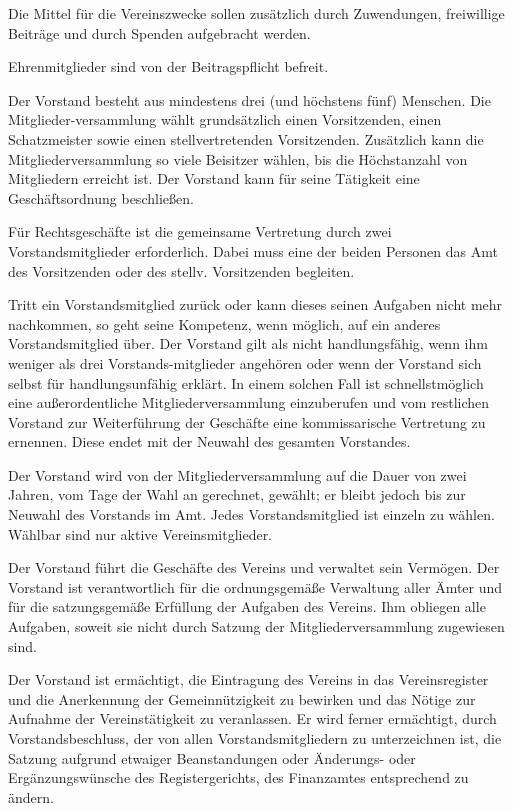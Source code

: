 \documentclass[parskip]{scrartcl}
\begin{document}
\begin{contract}
Die Mittel für die Vereinszwecke sollen zusätzlich durch Zuwendungen, freiwillige Beiträge und durch Spenden aufgebracht werden.

Ehrenmitglieder sind von der Beitragspflicht befreit.


Der Vorstand besteht aus mindestens drei (und höchstens fünf) Menschen. Die Mitglieder-versammlung wählt grundsätzlich einen Vorsitzenden, einen Schatzmeister sowie einen stellvertretenden Vorsitzenden. Zusätzlich kann die Mitgliederversammlung so viele Beisitzer wählen, bis die Höchstanzahl von Mitgliedern erreicht ist. Der Vorstand kann für seine Tätigkeit eine Geschäftsordnung beschließen.

Für Rechtsgeschäfte ist die gemeinsame Vertretung durch zwei Vorstandsmitglieder erforderlich. Dabei muss eine der beiden Personen das Amt des Vorsitzenden oder des stellv. Vorsitzenden begleiten.

Tritt ein Vorstandsmitglied zurück oder kann dieses seinen Aufgaben nicht mehr nachkommen, so geht seine Kompetenz, wenn möglich, auf ein anderes Vorstandsmitglied über. Der Vorstand gilt als nicht handlungsfähig, wenn ihm weniger als drei Vorstands-mitglieder angehören oder wenn der Vorstand sich selbst für handlungsunfähig erklärt. In einem solchen Fall ist schnellstmöglich eine außerordentliche Mitgliederversammlung einzuberufen und vom restlichen Vorstand zur Weiterführung der Geschäfte eine kommissarische Vertretung zu ernennen. Diese endet mit der Neuwahl des gesamten Vorstandes.


Der Vorstand wird von der Mitgliederversammlung auf die Dauer von zwei Jahren, vom Tage der Wahl an gerechnet, gewählt; er bleibt jedoch bis zur Neuwahl des Vorstands im Amt. Jedes Vorstandsmitglied ist einzeln zu wählen. Wählbar sind nur aktive Vereinsmitglieder.

Der Vorstand führt die Geschäfte des Vereins und verwaltet sein Vermögen. Der Vorstand ist verantwortlich für die ordnungsgemäße Verwaltung aller Ämter und für die satzungsgemäße Erfüllung der Aufgaben des Vereins. Ihm obliegen alle Aufgaben, soweit sie nicht durch Satzung der Mitgliederversammlung zugewiesen sind.

Der Vorstand ist ermächtigt, die Eintragung des Vereins in das Vereinsregister und die Anerkennung der Gemeinnützigkeit zu bewirken und das Nötige zur Aufnahme der Vereinstätigkeit zu veranlassen. Er wird ferner ermächtigt, durch Vorstandsbeschluss, der von allen Vorstandsmitgliedern zu unterzeichnen ist, die Satzung aufgrund etwaiger Beanstandungen oder Änderungs- oder Ergänzungswünsche des Registergerichts, des Finanzamtes entsprechend zu ändern.


\end{contract}
\end{document}
